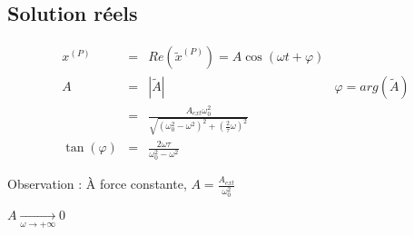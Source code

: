 \subsection{Solution réels}

\[\begin{array}{rclr}
	x^{(P)} &=& Re(\tilde{x}^{(P)}) = A\cos(\omega t + \varphi) \\
	A &=& |\tilde{A}| & \varphi = arg(\tilde{A}) \\
	&=& \frac{A_{ext}\omega_0^2}{\sqrt{(\omega_0^2 - \omega^2)^2 + (\frac{2}{\tau}\omega)^2}}\\
	\tan(\varphi) &=& \frac{2\omega \tau}{\omega_0^2 - \omega^2}
\end{array}\]

Observation : À force constante, $A = \frac{A_{ext}}{\omega_0^2}$

$A \xrightarrow[\omega \to +\infty]{} 0$
